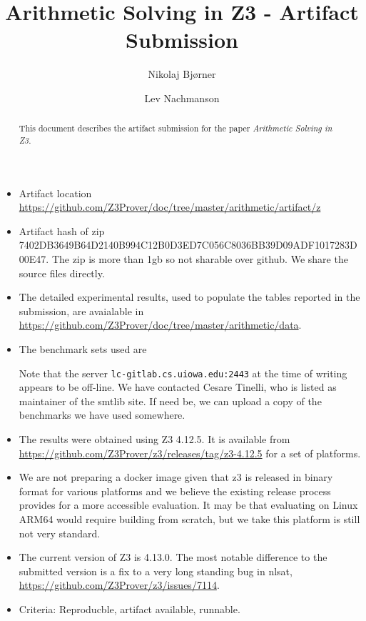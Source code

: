 \documentclass{llncs}
\title{Arithmetic Solving in Z3 - Artifact Submission}
\author{Nikolaj Bj\o{}rner\and
  Lev Nachmanson}
\institute{Microsoft}
\begin{document}
\maketitle

\begin{abstract}
  This document describes the artifact submission for the paper \emph{Arithmetic Solving in Z3}.
\end{abstract}

\begin{itemize}
\item Artifact location \url{https://github.com/Z3Prover/doc/tree/master/arithmetic/artifact/z}
\item Artifact hash of zip 7402DB3649B64D2140B994C12B0D3ED7C056C8036BB39D09ADF1017283D00E47. The zip is more than 1gb so not sharable over github. We share the source files directly.
\item The detailed experimental results, used to populate the tables reported in the submission, are avaialable in \url{https://github.com/Z3Prover/doc/tree/master/arithmetic/data}.
\item The benchmark sets used are
  Note that the server \texttt{lc-gitlab.cs.uiowa.edu:2443} at the time of writing appears to be off-line. We have contacted Cesare Tinelli, who is listed as maintainer of the smtlib site. 
  If need be, we can upload a copy of the benchmarks we have used somewhere.  
\item The results were obtained using Z3  4.12.5. It is available from
  \url{https://github.com/Z3Prover/z3/releases/tag/z3-4.12.5} for a set of platforms.
\item We are not preparing a docker image given that z3 is released in binary format for various platforms and we believe the existing release process provides for a more accessible evaluation. It may be that evaluating on Linux ARM64 would require building from scratch, but we take this platform is still not very standard.
\item The current version of Z3 is 4.13.0. The most notable difference to the submitted version is a fix to a very long standing bug in nlsat,
  \url{https://github.com/Z3Prover/z3/issues/7114}.
\item Criteria: Reproducble, artifact available, runnable.
\end{itemize}
\end{document}
